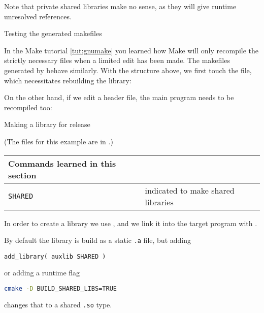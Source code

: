 Note that private shared libraries make no sense, as they will give
runtime unresolved references.

 {Testing the generated makefiles}

In the Make tutorial \ref{tut:gnumake} you learned how Make will only recompile
the strictly necessary files when a limited edit has been made.
The makefiles generated by  behave similarly.
With the structure above, we first touch the  file,
which necessitates rebuilding the library:
%


On the other hand, if we edit a header file, the main program
needs to be recompiled too:
%


\newpage
{} {Making a library for release}
\label{sec:cmake-public-lib}

(The files for this example are in .)

\begin{tabular}{lp{3in}}
  \toprule
  Commands learned in this section\\
  \midrule
  \lstinline+SHARED+&indicated to make shared libraries\\
  \bottomrule
\end{tabular}

\begin{floatingfigure}[r]{2.5in}
  \begin{minipage}{2.5in}
  \end{minipage}
\end{floatingfigure}
%
In order to create a library we use ,
and we link it into the target program with .

By default the library is build as a static \texttt{.a} file,
but adding
\begin{lstlisting}
add_library( auxlib SHARED )
\end{lstlisting}
or adding a runtime flag
\begin{lstlisting}[language=bash]
cmake -D BUILD_SHARED_LIBS=TRUE
\end{lstlisting}
changes that to a shared \texttt{.so} type.

